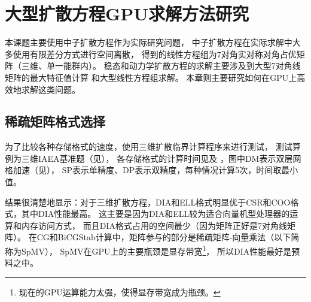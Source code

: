 

\chapter{大型扩散方程GPU求解方法研究}

本课题主要使用中子扩散方程作为实际研究问题，
中子扩散方程在实际求解中大多使用有限差分方式进行空间离散，
得到的线性方程组为7对角实对称对角占优矩阵（三维、单一能群内）。
稳态和动力学扩散方程的求解主要涉及到大型7对角线矩阵的最大特征值计算
和大型线性方程组求解。
本章则主要研究如何在GPU上高效地求解这类问题。

\section{稀疏矩阵格式选择}

为了比较各种存储格式的速度，使用三维扩散临界计算程序来进行测试，
测试算例为三维IAEA基准题（见），
各存储格式的计算时间见及
，图中DM表示双层网格加速（见），
SP表示单精度、DP表示双精度，每种情况计算5次，时间取最小值。

结果很清楚地显示：对于三维扩散方程，DIA和ELL格式明显优于CSR和COO格式，其中DIA性能最高。
这主要是因为DIA和ELL较为适合向量机型处理器的运算和内存访问方式，
而且DIA格式占用的空间最少（因为矩阵正好是7对角线矩阵）。
在CG和BiCGStab计算中，矩阵参与的部分是稀疏矩阵-向量乘法（以下简称为SpMV），
SpMV在GPU上的主要瓶颈是显存带宽\cite{bell2008spmv,baskaran2008optimizing}\footnote{现在的GPU运算能力太强，使得显存带宽成为瓶颈。}，
所以DIA性能最好是预料之中。

